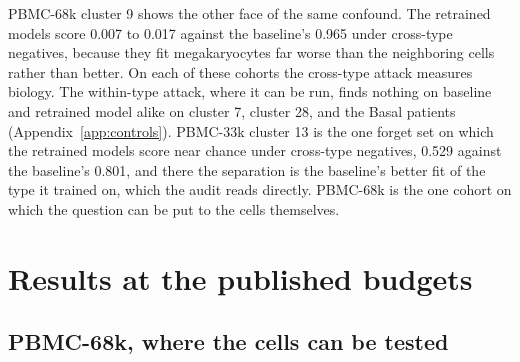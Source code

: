 \documentclass{article}
\begin{document}
PBMC-68k cluster 9 shows the other face of the same confound. The retrained models score 0.007 to 0.017 against the baseline's 0.965 under cross-type negatives, because they fit megakaryocytes far worse than the neighboring cells rather than better. On each of these cohorts the cross-type attack measures biology. The within-type attack, where it can be run, finds nothing on baseline and retrained model alike on cluster 7, cluster 28, and the Basal patients (Appendix~\ref{app:controls}). PBMC-33k cluster 13 is the one forget set on which the retrained models score near chance under cross-type negatives, 0.529 against the baseline's 0.801, and there the separation is the baseline's better fit of the type it trained on, which the audit reads directly. PBMC-68k is the one cohort on which the question can be put to the cells themselves.

\begin{table}[t]
\centering
\caption{Attacker AUC of the baseline and the retrained model on every cohort, each with its advantage $2|\mathrm{AUC}-0.5|$ in parentheses, under cross-type negatives and, where a held-out set of the same type exists, within-type negatives (the standardized logistic refit). An inverted AUC yields a large advantage, which is why the AUC is reported beside it; the retrained models' large advantages here are their worse fit of the forget type, not leakage. Generated from the per-cohort result files.}
\label{tab:confound}
\small
\resizebox{\textwidth}{!}{}
\end{table}

\section{Results at the published budgets}
\label{sec:results}

\subsection{PBMC-68k, where the cells can be tested}
\label{sec:pbmc68k}
\end{document}

